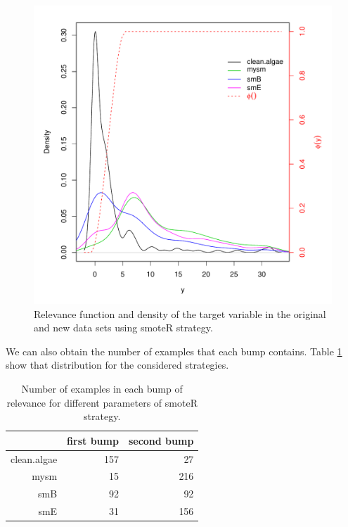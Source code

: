 \documentclass[10pt,a4paper]{article}\usepackage[]{graphicx}\usepackage[]{color}
\makeatletter
\def\maxwidth{ %
  \ifdim\Gin@nat@width>\linewidth
    \linewidth
  \else
    \Gin@nat@width
  \fi
}
\newenvironment{knitrout}{}{} %
\makeatother
\begin{document}
\begin{knitrout}\footnotesize
{}\color{fgcolor}\begin{figure}

{\centering \includegraphics[width=\maxwidth]{figures/UBL-smoteR_plot1-1} 

}

\caption[Relevance function and density of the target variable in the original and new data sets using smoteR strategy]{Relevance function and density of the target variable in the original and new data sets using smoteR strategy.}\label{fig:smoteR_plot1}
\end{figure}


\end{knitrout}


We can also obtain the number of examples that each bump contains. Table \ref{tab:smoteR_1} show that distribution for the considered strategies.




\begin{table}[ht]
\centering
\begin{tabular}{rrr}
  \hline
 & first bump & second bump \\ 
  \hline
clean.algae & 157 &  27 \\ 
  mysm &  15 & 216 \\ 
  smB &  92 &  92 \\ 
  smE &  31 & 156 \\ 
   \hline
\end{tabular}
\caption{Number of examples in each bump of relevance for different parameters of smoteR strategy.} 
\label{tab:smoteR_1}
\end{table}
\end{document}
